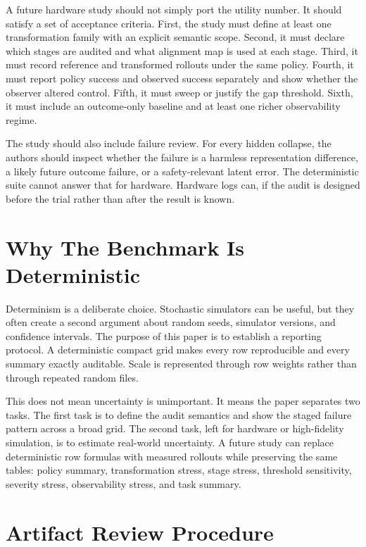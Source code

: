 \documentclass{article}
\begin{document}
A future hardware study should not simply port the utility number. It should satisfy a set of acceptance criteria. First, the study must define at least one transformation family with an explicit semantic scope. Second, it must declare which stages are audited and what alignment map is used at each stage. Third, it must record reference and transformed rollouts under the same policy. Fourth, it must report policy success and observed success separately and show whether the observer altered control. Fifth, it must sweep or justify the gap threshold. Sixth, it must include an outcome-only baseline and at least one richer observability regime.

The study should also include failure review. For every hidden collapse, the authors should inspect whether the failure is a harmless representation difference, a likely future outcome failure, or a safety-relevant latent error. The deterministic suite cannot answer that for hardware. Hardware logs can, if the audit is designed before the trial rather than after the result is known.

\section{Why The Benchmark Is Deterministic}

Determinism is a deliberate choice. Stochastic simulators can be useful, but they often create a second argument about random seeds, simulator versions, and confidence intervals. The purpose of this paper is to establish a reporting protocol. A deterministic compact grid makes every row reproducible and every summary exactly auditable. Scale is represented through row weights rather than through repeated random files.

This does not mean uncertainty is unimportant. It means the paper separates two tasks. The first task is to define the audit semantics and show the staged failure pattern across a broad grid. The second task, left for hardware or high-fidelity simulation, is to estimate real-world uncertainty. A future study can replace deterministic row formulas with measured rollouts while preserving the same tables: policy summary, transformation stress, stage stress, threshold sensitivity, severity stress, observability stress, and task summary.

\section{Artifact Review Procedure}
\end{document}
